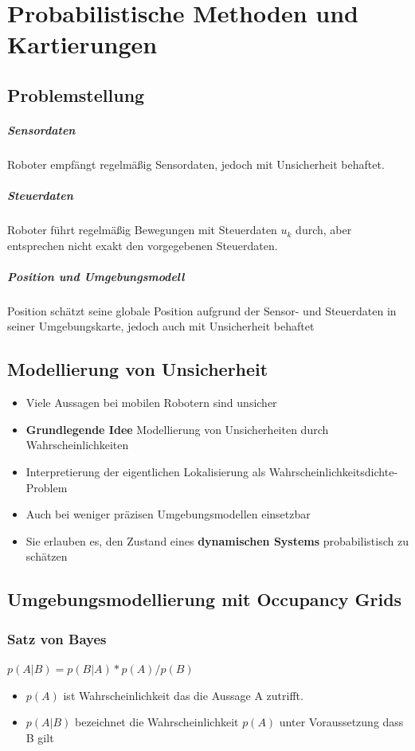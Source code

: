\chapter{Probabilistische Methoden und Kartierungen}
\section{Problemstellung}
\paragraph{Sensordaten} 
Roboter empfängt regelmäßig Sensordaten, jedoch mit Unsicherheit behaftet.
\paragraph{Steuerdaten}
Roboter führt regelmäßig Bewegungen mit Steuerdaten $u_k$ durch, aber entsprechen nicht exakt den vorgegebenen Steuerdaten.
\paragraph{Position und Umgebungsmodell}
Position schätzt seine globale Position aufgrund der Sensor- und Steuerdaten in seiner Umgebungskarte, jedoch auch mit Unsicherheit behaftet
\section{Modellierung von Unsicherheit}
\begin{itemize}
	\item Viele Aussagen bei mobilen Robotern sind unsicher 
	\item \textbf{Grundlegende Idee} Modellierung von Unsicherheiten durch Wahrscheinlichkeiten
	\item Interpretierung der eigentlichen Lokalisierung als Wahrscheinlichkeitsdichte-Problem
	\item Auch bei weniger präzisen Umgebungsmodellen einsetzbar
	\item Sie erlauben es, den Zustand eines \textbf{dynamischen Systems} probabilistisch zu schätzen
\end{itemize}
\section{Umgebungsmodellierung mit Occupancy Grids}
\subsection{Satz von Bayes}
$p (A|B) = p(B|A) * p(A) / p(B)$
\begin{itemize}
	\item $p(A)$ ist Wahrscheinlichkeit das die Aussage A zutrifft.
	\item $p(A|B)$ bezeichnet die Wahrscheinlichkeit $p(A)$ unter Voraussetzung dass B gilt
\end{itemize}
